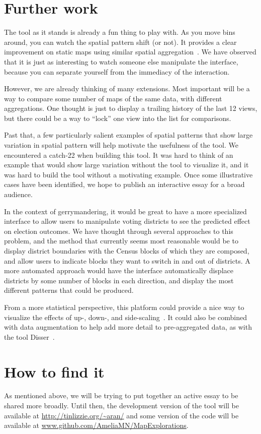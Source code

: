 \documentclass{article}\usepackage[]{graphicx}\usepackage[]{color}
\begin{document}
\section{Further work}

The tool as it stands is already a fun thing to play with. As you move bins around, you can watch the spatial pattern shift (or not). It provides a clear improvement on static maps using similar spatial aggregation~\citep{SulTelWoo2008, Fel2015}. We have observed that it is just as interesting to watch someone else manipulate the interface, because you can separate yourself from the immediacy of the interaction. 

However, we are already thinking of many extensions. Most important will be a way to compare some number of maps of the same data, with different aggregations. One thought is just to display a trailing history of the last 12 views, but there could be a way to ``lock'' one view into the list for comparisons. 

Past that, a few particularly salient examples of spatial patterns that show large variation in spatial pattern will help motivate the usefulness of the tool. We encountered a catch-22 when building this tool. It was hard to think of an example that would show large variation without the tool to visualize it, and it was hard to build the tool without a motivating example. Once some illustrative cases have been identified, we hope to publish an interactive essay for a broad audience. 

In the context of gerrymandering, it would be great to have a more specialized interface to allow users to manipulate voting districts to see the predicted effect on election outcomes. We have thought through several approaches to this problem, and the method that currently seems most reasonable would be to display district boundaries with the Census blocks of which they are composed, and allow users to indicate blocks they want to switch in and out of districts. A more automated approach would have the interface automatically displace districts by some number of blocks in each direction, and display the most different patterns that could be produced. 

From a more statistical perspective, this platform could provide a nice way to visualize the effects of up-, down-, and side-scaling~\citep{Atk2013, Kyr2004}. It could also be combined with data augmentation to help add more detail to pre-aggregated data, as with the tool Disser~\citep{Mar2014}. 


\section{How to find it}

As mentioned above, we will be trying to put together an active essay to be shared more broadly. Until then, the development version of the tool will be available at \url{http://tinlizzie.org/~aran/} and some version of the code will be available at \url{www.github.com/AmeliaMN/MapExplorations}. 
\clearpage




 


\end{document}
